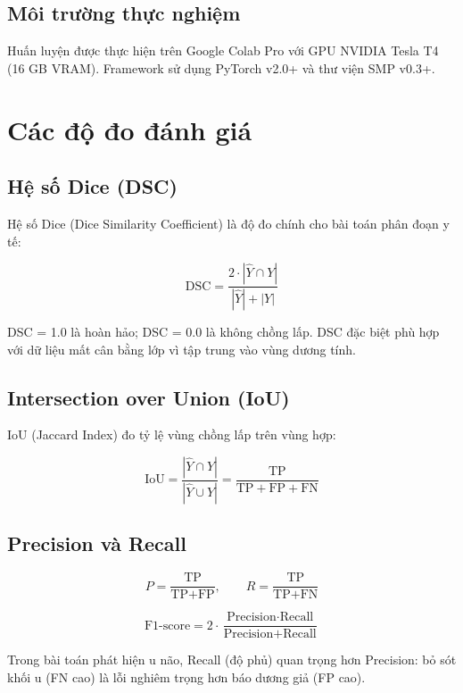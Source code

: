 \subsection{Môi trường thực nghiệm}

Huấn luyện được thực hiện trên Google Colab Pro với GPU NVIDIA Tesla T4 (16 GB VRAM). Framework sử dụng PyTorch \cite{Paszke2019} v2.0+ và thư viện SMP \cite{Yakubovskiy2019} v0.3+.

\section{Các độ đo đánh giá}

\subsection{Hệ số Dice (DSC)}

Hệ số Dice (Dice Similarity Coefficient) là độ đo chính cho bài toán phân đoạn y tế:

\begin{equation}
    \text{DSC} = \frac{2 \cdot |\hat{Y} \cap Y|}{|\hat{Y}| + |Y|}
    \label{eq:dsc}
\end{equation}

DSC = 1.0 là hoàn hảo; DSC = 0.0 là không chồng lấp. DSC đặc biệt phù hợp với dữ liệu mất cân bằng lớp vì tập trung vào vùng dương tính.

\subsection{Intersection over Union (IoU)}

IoU (Jaccard Index) đo tỷ lệ vùng chồng lấp trên vùng hợp:

\begin{equation}
    \text{IoU} = \frac{|\hat{Y} \cap Y|}{|\hat{Y} \cup Y|} = \frac{\text{TP}}{\text{TP} + \text{FP} + \text{FN}}
    \label{eq:iou}
\end{equation}

\subsection{Precision và Recall}

\begin{equation}
    P = \frac{\text{TP}}{\text{TP} + \text{FP}}, \qquad
    R = \frac{\text{TP}}{\text{TP} + \text{FN}}
    \label{eq:pr}
\end{equation}

\begin{equation}
\text{F1-score} = 2 \cdot \frac{\text{Precision} \cdot \text{Recall}}{\text{Precision} + \text{Recall}}
\end{equation}

Trong bài toán phát hiện u não, Recall (độ phủ) quan trọng hơn Precision: bỏ sót khối u (FN cao) là lỗi nghiêm trọng hơn báo dương giả (FP cao).
